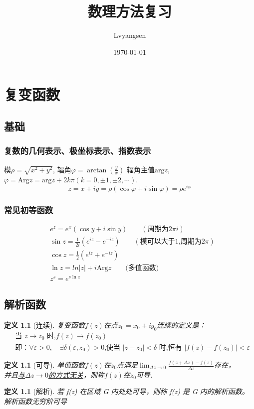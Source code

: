 \documentclass[11pt, a4paper, twoside]{ctexbook}
\title{\textbf{数理方法复习}}
\author{Lvyangsen}
\date{\today}
\newtheorem{definition}[theorem]{定义}
\begin{document}
\maketitle

\setcounter{page}{0}
\newpage
{}
\setcounter{page}{1}
\tableofcontents
\newpage
\setcounter{page}{1}

\newpage
\chapter{复变函数}
\section{基础}
\subsection{复数的几何表示、极坐标表示、指数表示}
模$\rho = \sqrt{x^2 +y^2}$, 辐角$\varphi = \arctan(\frac{y}{x})$
辐角主值$\mathrm{arg}z$, $\varphi = \mathrm{Arg} z = \mathrm{arg} z + 2k\pi(k = 0, \pm1,\pm 2, \cdots )$.
$$z = x + iy = \rho(\cos \varphi+ i\sin \varphi) = \rho e^{i\varphi}$$
\subsection{常见初等函数}
$$\begin{aligned}
    &e^z = e^x(\cos y + i \sin y) \qquad (\text{周期为}2\pi i)\\ 
    &\sin z = \frac{1}{2i}(e^{iz}-e^{-iz}) \qquad(\text{模可以大于1,周期为}2\pi)\\
    &\cos z = \frac{1}{2}(e^{iz}+e^{-iz})\\
    &\ln z = ln|z|+i\mathrm{Arg}z\qquad\text{(多值函数)}\\
    &z^s = e^{s\ln z}
\end{aligned}$$
\section{解析函数}
\begin{definition}[连续]
复变函数$f(z)$在点$z_0= x_0+ $i$y_0$连续的定义是：
$$
\begin{aligned}
    &\text{当 }z\to z_0\text{ 时,}f(z)\to f(z_0)\\
    &\text{即：}\forall\varepsilon>0,\quad \exists\delta(\varepsilon,z_0)>0\text{,使当 }|z-z_0|<\delta\text{ 时,恒有 }|f(z)-f(z_0)|<\varepsilon 
\end{aligned}
$$
\end{definition}
\begin{definition}[可导]
    单值函数$f(z)$在$z_0$点满足$\lim_{\Delta z\to0}\frac{f(z+\Delta z)-f(z)}{\Delta z}$存在，\\
    并且\underline{与$\Delta z \to 0$的方式无关}，则称$f(z)$在$z_0$可导.
\end{definition}
\begin{definition}[解析]
    若 f(z) 在区域 G 内处处可导，则称 f(z) 是 G 内的解析函数。解析函数无穷阶可导
\end{definition}
\end{document}
